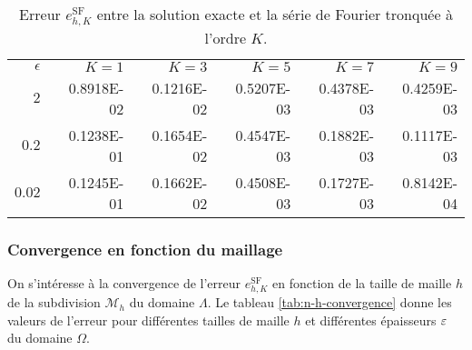 \begin{table}[t]
  \caption{Erreur $e_{h,K}^\mathrm{SF}$ entre la solution exacte et la
    série de Fourier tronquée à l'ordre $K$.}
  \label{tab:h-k-convergence}
  \begin{center}
    \begin{tabular}{@{}rrrrrr@{}}
      \toprule
      $\epsilon$   & $K = 1$ & $K = 3$ & $K = 5$ & $K = 7$ & $K = 9$\\
      \cmidrule{1-6}
      $2$      & \num{0.8918E-02} & \num{0.1216E-02} & \num{0.5207E-03} & \num{0.4378E-03} & \num{0.4259E-03} \\
      $0.2$    & \num{0.1238E-01} & \num{0.1654E-02} & \num{0.4547E-03} & \num{0.1882E-03} & \num{0.1117E-03} \\
      $0.02$   & \num{0.1245E-01} & \num{0.1662E-02} & \num{0.4508E-03} & \num{0.1727E-03} & \num{0.8142E-04} \\
      \bottomrule
    \end{tabular}
  \end{center}
\end{table}


\subsubsection{Convergence en fonction du maillage}
On s'intéresse à la convergence de l'erreur $e_{h,K}^\mathrm{SF}$ en
fonction de la taille de maille $h$ de la subdivision $\mathcal M_h$ du domaine
$\Lambda$. Le tableau \ref{tab:n-h-convergence} donne les valeurs de
l'erreur pour différentes tailles de maille $h$ et différentes
épaisseurs $\varepsilon$ du domaine $\Omega$.

